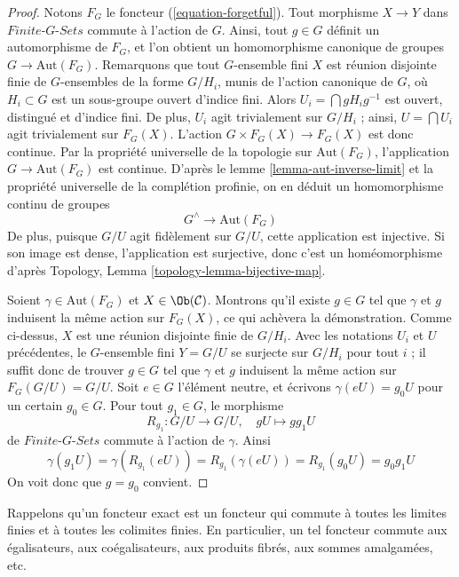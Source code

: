 \begin{proof}
Notons $F_G$ le foncteur (\ref{equation-forgetful}). Tout morphisme
$X \to Y$ dans $\textit{Finite-}G\textit{-Sets}$ commute à l'action de $G$.
Ainsi, tout $g \in G$ définit un automorphisme de $F_G$, et l'on obtient un
homomorphisme canonique de groupes $G \to \text{Aut}(F_G)$.
Remarquons que tout $G$-ensemble fini $X$ est réunion disjointe finie de
$G$-ensembles de la forme $G/H_i$, munis de l'action canonique de $G$, où
$H_i \subset G$ est un sous-groupe ouvert d'indice fini. Alors
$U_i = \bigcap gH_ig^{-1}$ est ouvert, distingué et d'indice fini.
De plus, $U_i$ agit trivialement sur $G/H_i$ ; ainsi,
$U = \bigcap U_i$ agit trivialement sur $F_G(X)$. L'action
$G \times F_G(X) \to F_G(X)$ est donc continue. Par la propriété universelle
de la topologie sur $\text{Aut}(F_G)$, l'application
$G \to \text{Aut}(F_G)$ est continue.
D'après le lemme \ref{lemma-aut-inverse-limit} et la propriété universelle
de la complétion profinie, on en déduit un homomorphisme continu de groupes
$$
G^\wedge \longrightarrow \text{Aut}(F_G)
$$
De plus, puisque $G/U$ agit fidèlement sur $G/U$, cette application est
injective. Si son image est dense, l'application est surjective, donc c'est
un homéomorphisme d'après Topology, Lemma
\ref{topology-lemma-bijective-map}.

\medskip\noindent
Soient $\gamma \in \text{Aut}(F_G)$ et $X \in \Ob(\mathcal{C})$.
Montrons qu'il existe $g \in G$ tel que $\gamma$ et $g$ induisent la même
action sur $F_G(X)$, ce qui achèvera la démonstration. Comme ci-dessus,
$X$ est une réunion disjointe finie de $G/H_i$. Avec les notations $U_i$ et
$U$ précédentes, le $G$-ensemble fini $Y = G/U$ se surjecte sur $G/H_i$ pour
tout $i$ ; il suffit donc de trouver $g \in G$ tel que $\gamma$ et $g$
induisent la même action sur $F_G(G/U) = G/U$. Soit $e \in G$ l'élément
neutre, et écrivons $\gamma(eU) = g_0U$ pour un certain $g_0 \in G$.
Pour tout $g_1 \in G$, le morphisme
$$
R_{g_1} : G/U \longrightarrow G/U,\quad gU \longmapsto gg_1U
$$
de $\textit{Finite-}G\textit{-Sets}$ commute à l'action de $\gamma$. Ainsi
$$
\gamma(g_1U) = \gamma(R_{g_1}(eU)) = R_{g_1}(\gamma(eU)) =
R_{g_1}(g_0U) = g_0g_1U
$$
On voit donc que $g = g_0$ convient.
\end{proof}

\noindent
Rappelons qu'un foncteur exact est un foncteur qui commute à toutes les
limites finies et à toutes les colimites finies. En particulier, un tel
foncteur commute aux égalisateurs, aux coégalisateurs, aux produits fibrés,
aux sommes amalgamées, etc.

